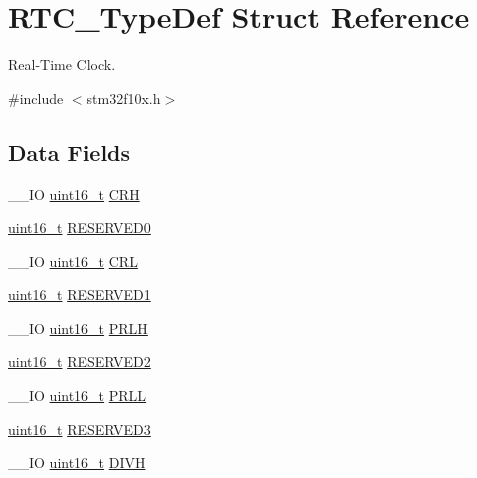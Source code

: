 \hypertarget{struct_r_t_c___type_def}{\section{R\-T\-C\-\_\-\-Type\-Def Struct Reference}
\label{struct_r_t_c___type_def}
}


Real-\/\-Time Clock.  




{\ttfamily \#include $<$stm32f10x.\-h$>$}

\subsection*{Data Fields}
\begin{DoxyCompactItemize}
\item 
\-\_\-\-\_\-\-I\-O \hyperlink{stdint_8h_a273cf69d639a59973b6019625df33e30}{uint16\-\_\-t} \hyperlink{struct_r_t_c___type_def_aad5162f4b5b15deb174479e8e543db82}{C\-R\-H}
\item 
\hyperlink{stdint_8h_a273cf69d639a59973b6019625df33e30}{uint16\-\_\-t} \hyperlink{struct_r_t_c___type_def_a6d55bb337c409f849725a774364ce3bc}{R\-E\-S\-E\-R\-V\-E\-D0}
\item 
\-\_\-\-\_\-\-I\-O \hyperlink{stdint_8h_a273cf69d639a59973b6019625df33e30}{uint16\-\_\-t} \hyperlink{struct_r_t_c___type_def_a95b9e1ed044a4e1cc3632326e7250767}{C\-R\-L}
\item 
\hyperlink{stdint_8h_a273cf69d639a59973b6019625df33e30}{uint16\-\_\-t} \hyperlink{struct_r_t_c___type_def_a8a152da628dbdba2e849adf196fa341a}{R\-E\-S\-E\-R\-V\-E\-D1}
\item 
\-\_\-\-\_\-\-I\-O \hyperlink{stdint_8h_a273cf69d639a59973b6019625df33e30}{uint16\-\_\-t} \hyperlink{struct_r_t_c___type_def_a831b0b55bae7921faa7d16c6f3160449}{P\-R\-L\-H}
\item 
\hyperlink{stdint_8h_a273cf69d639a59973b6019625df33e30}{uint16\-\_\-t} \hyperlink{struct_r_t_c___type_def_aaa77e68ac9af2be5c095c05a50efe2e4}{R\-E\-S\-E\-R\-V\-E\-D2}
\item 
\-\_\-\-\_\-\-I\-O \hyperlink{stdint_8h_a273cf69d639a59973b6019625df33e30}{uint16\-\_\-t} \hyperlink{struct_r_t_c___type_def_a03cf96aff11c288096d30a66afd19899}{P\-R\-L\-L}
\item 
\hyperlink{stdint_8h_a273cf69d639a59973b6019625df33e30}{uint16\-\_\-t} \hyperlink{struct_r_t_c___type_def_a5489f7c3119b8e7b55d77a465baf223a}{R\-E\-S\-E\-R\-V\-E\-D3}
\item 
\-\_\-\-\_\-\-I\-O \hyperlink{stdint_8h_a273cf69d639a59973b6019625df33e30}{uint16\-\_\-t} \hyperlink{struct_r_t_c___type_def_a224b675d0ecad8b6e26d9e4c32691a18}{D\-I\-V\-H}

\end{DoxyCompactItemize}

